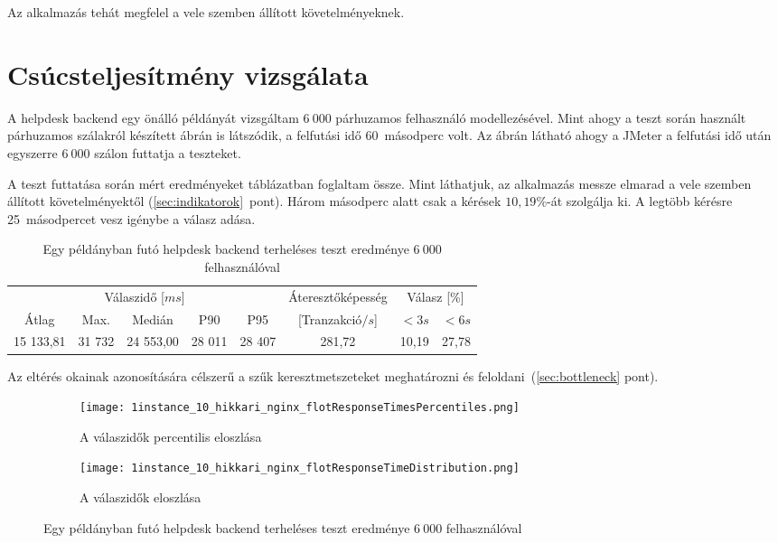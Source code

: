 Az alkalmazás tehát megfelel a vele szemben állított követelményeknek.



\section{Csúcsteljesítmény vizsgálata}\label{sec:peak_1_instance}
A helpdesk backend egy önálló példányát vizsgáltam $6~000$ párhuzamos felhasználó modellezésével. Mint ahogy a teszt során használt párhuzamos szálakról készített  ábrán is látszódik, a felfutási idő $60$~másodperc volt. Az ábrán látható ahogy a JMeter a felfutási idő után egyszerre $6~000$ szálon futtatja a teszteket.

A teszt futtatása során mért eredményeket  táblázatban foglaltam össze. Mint láthatjuk, az alkalmazás messze elmarad a vele szemben állított követelményektől (\ref{sec:indikatorok}~pont). Három másodperc alatt csak a kérések $10,19\%$-át szolgálja ki. A legtöbb kérésre 25~másodpercet vesz igénybe a válasz adása.

\begin{table}[hbt]

		\begin{tabular}{ccccc|c|cc}
			\multicolumn{5}{c|}{Válaszidő [$ms$]}  & Áteresztőképesség & \multicolumn{2}{c}{Válasz [\%]}	\\
			Átlag & Max. & Medián & P90 & P95 &	[Tranzakció$/s$] & $<3s$& $<6s$ \\
			\hline 
			15 133,81 & 31 732 & 24 553,00 & 28 011 & 28 407  & 281,72 &	10,19 & 27,78 \\
		\end{tabular} 

	\caption{Egy példányban futó helpdesk backend terheléses teszt eredménye $6~000$ felhasználóval}
	\label{tabl:1_instance_10_hikkari_nginx}
\end{table}

Az eltérés okainak azonosítására célszerű a szűk keresztmetszeteket meghatározni és feloldani~(\ref{sec:bottleneck} pont).

\begin{figure}[hbt]
	\begin{subfigure}{.9\textwidth}
		\centering
		\texttt{[image: 1instance\_10\_hikkari\_nginx\_flotResponseTimesPercentiles.png]}  
		\caption{A válaszidők percentilis eloszlása}
	\end{subfigure}
	\begin{subfigure}{.9\textwidth}
		\centering
		\texttt{[image: 1instance\_10\_hikkari\_nginx\_flotResponseTimeDistribution.png]}  
		\caption{A válaszidők eloszlása}
	\end{subfigure}
	
	\caption[Helpdesk backend terheléses teszt egy példánnyal]{Egy példányban futó helpdesk backend terheléses teszt eredménye $6~000$ felhasználóval}
\end{figure}

